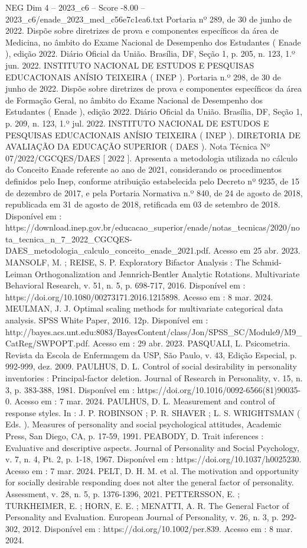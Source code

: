 \begin{textsample}{NEG Dim 4 – 2023\_c6 – Score -8.00 – 2023\_c6/enade\_2023\_med\_c56e7c1ea6.txt}
Portaria nº 289, de 30 de junho de 2022.
Dispõe sobre diretrizes de prova e componentes específicos da área de Medicina, no âmbito do Exame Nacional de Desempenho dos Estudantes ( Enade ), edição 2022.
Diário Oficial da União.
Brasília, DF, Seção 1, p. 205, n. 123, 1.º jun. 2022.
INSTITUTO NACIONAL DE ESTUDOS E PESQUISAS EDUCACIONAIS ANÍSIO TEIXEIRA ( INEP ).
Portaria n.º 298, de 30 de junho de 2022.
Dispõe sobre diretrizes de prova e componentes específicos da área de Formação Geral, no âmbito do Exame Nacional de Desempenho dos Estudantes ( Enade ), edição 2022.
Diário Oficial da União.
Brasília, DF, Seção 1, p. 209, n. 123, 1.º jul. 2022.
INSTITUTO NACIONAL DE ESTUDOS E PESQUISAS EDUCACIONAIS ANÍSIO TEIXEIRA ( INEP ).
DIRETORIA DE AVALIAÇÃO DA EDUCAÇÃO SUPERIOR ( DAES ).
Nota Técnica Nº 07/2022/CGCQES/DAES [ 2022 ].
Apresenta a metodologia utilizada no cálculo do Conceito Enade referente ao ano de 2021, considerando os procedimentos definidos pelo Inep, conforme atribuição estabelecida pelo Decreto nº 9235, de 15 de dezembro de 2017, e pela Portaria Normativa n.º 840, de 24 de agosto de 2018, republicada em 31 de agosto de 2018, retificada em 03 de setembro de 2018.
Disponível em : https://download.inep.gov.br/educacao\_superior/enade/notas\_tecnicas/2020/nota\_tecnica\_n\_7\_2022\_CGCQES-DAES\_metodologia\_calculo\_conceito\_enade\_2021.pdf.
Acesso em 25 abr. 2023.
MANSOLF, M. ; REISE, S.
P.
Exploratory Bifactor Analysis : The Schmid-Leiman Orthogonalization and Jennrich-Bentler Analytic Rotations.
Multivariate Behavioral Research, v. 51, n. 5, p. 698-717, 2016.
Disponível em : https://doi.org/10.1080/00273171.2016.1215898.
Acesso em : 8 mar. 2024.
MEULMAN, J.
J.
Optimal scaling methods for multivariate categorical data analysis.
SPSS White Paper, 2016. 12p.
Disponível em : http://bayes.acs.unt.edu:8083/BayesContent/class/Jon/SPSS\_SC/Module9/M9\_CatReg/SWPOPT.pdf.
Acesso em : 29 abr. 2023.
PASQUALI, L.
Psicometria.
Revista da Escola de Enfermagem da USP, São Paulo, v. 43, Edição Especial, p. 992-999, dez. 2009.
PAULHUS, D.
L.
Control of social desirability in personality inventories : Principal-factor deletion.
Journal of Research in Personality, v. 15, n. 3, p. 383-388, 1981.
Disponível em : https://doi.org/10.1016/0092-6566(81)90035-0.
Acesso em : 7 mar. 2024.
PAULHUS, D.
L.
Measurement and control of response styles.
In : J.
P.
ROBINSON ; P.
R.
SHAVER ; L.
S.
WRIGHTSMAN ( Eds. ).
Measures of personality and social psychological attitudes, Academic Press, San Diego, CA, p. 17-59, 1991.
PEABODY, D.
Trait inferences : Evaluative and descriptive aspects.
Journal of Personality and Social Psychology, v. 7, n. 4, Pt. 2, p. 1-18, 1967.
Disponível em : https://doi.org/10.1037/h0025230.
Acesso em : 7 mar. 2024.
PELT, D.
H.
M. et al.
The motivation and opportunity for socially desirable responding does not alter the general factor of personality.
Assessment, v. 28, n. 5, p. 1376-1396, 2021.
PETTERSSON, E. ; TURKHEIMER, E. ; HORN, E.
E. ; MENATTI, A.
R.
The General Factor of Personality and Evaluation.
European Journal of Personality, v. 26, n. 3, p. 292-302, 2012.
Disponível em : https://doi.org/10.1002/per.839.
Acesso em : 8 mar. 2024.


\end{textsample}
